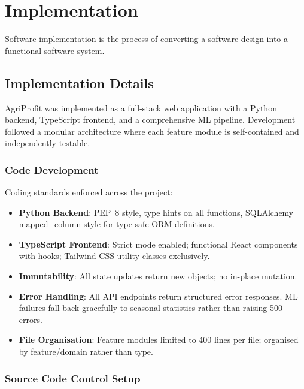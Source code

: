 \documentclass[12pt,a4paper]{report}
\begin{document}
\chapter{Implementation}

Software implementation is the process of converting a software design into a functional
software system.

\section{Implementation Details}

AgriProfit was implemented as a full-stack web application with a Python backend, TypeScript
frontend, and a comprehensive ML pipeline. Development followed a modular architecture
where each feature module is self-contained and independently testable.

\subsection{Code Development}

Coding standards enforced across the project:

\begin{itemize}
    \item \textbf{Python Backend}: PEP~8 style, type hints on all functions,
    SQLAlchemy mapped\_column style for type-safe ORM definitions.
    \item \textbf{TypeScript Frontend}: Strict mode enabled; functional React components
    with hooks; Tailwind CSS utility classes exclusively.
    \item \textbf{Immutability}: All state updates return new objects; no in-place mutation.
    \item \textbf{Error Handling}: All API endpoints return structured error responses.
    ML failures fall back gracefully to seasonal statistics rather than raising 500 errors.
    \item \textbf{File Organisation}: Feature modules limited to 400 lines per file;
    organised by feature/domain rather than type.
\end{itemize}

\subsection{Source Code Control Setup}
\end{document}

